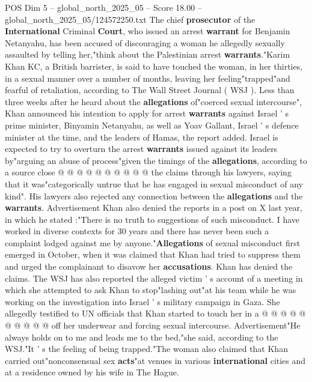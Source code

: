 \begin{textsample}{POS Dim 5 – global\_north\_2025\_05 – Score 18.00 – global\_north\_2025\_05/124572250.txt}  \label{ex:f5_pos_131}
The chief \textbf{prosecutor} of the \textbf{International} Criminal \textbf{Court}, who issued an arrest \textbf{warrant} for Benjamin Netanyahu, has been accused of discouraging a woman he allegedly sexually assaulted by telling her,"think about the Palestinian arrest \textbf{warrants}."Karim Khan KC, a British barrister, is said to have touched the woman, in her thirties, in a sexual manner over a number of months, leaving her feeling"trapped"and fearful of retaliation, according to The Wall Street Journal ( WSJ ).
Less than three weeks after he heard about the \textbf{allegations} of"coerced sexual intercourse", Khan announced his intention to apply for arrest \textbf{warrants} against Israel ' s prime minister, Binyamin Netanyahu, as well as Yoav Gallant, Israel ' s defence minister at the time, and the leaders of Hamas, the report added.
Israel is expected to try to overturn the arrest \textbf{warrants} issued against its leaders by"arguing an abuse of process"given the timings of the \textbf{allegations}, according to a source close @ @ @ @ @ @ @ @ @ @ the claims through his lawyers, saying that it was"categorically untrue that he has engaged in sexual misconduct of any kind".
His lawyers also rejected any connection between the \textbf{allegations} and the \textbf{warrants}.
Advertisement Khan also denied the reports in a post on X last year, in which he stated :"There is no truth to suggestions of such misconduct.
I have worked in diverse contexts for 30 years and there has never been such a complaint lodged against me by anyone."\textbf{Allegations} of sexual misconduct first emerged in October, when it was claimed that Khan had tried to suppress them and urged the complainant to disavow her \textbf{accusations}.
Khan has denied the claims.
The WSJ has also reported the alleged victim ' s account of a meeting in which she attempted to ask Khan to stop"lashing out"at his team while he was working on the investigation into Israel ' s military campaign in Gaza.
She allegedly testified to UN officials that Khan started to touch her in a @ @ @ @ @ @ @ @ @ @ off her underwear and forcing sexual intercourse.
Advertisement"He always holds on to me and leads me to the bed,"she said, according to the WSJ."It ' s the feeling of being trapped."The woman also claimed that Khan carried out"nonconsensual sex \textbf{acts}"at venues in various \textbf{international} cities and at a residence owned by his wife in The Hague.

\end{textsample}
